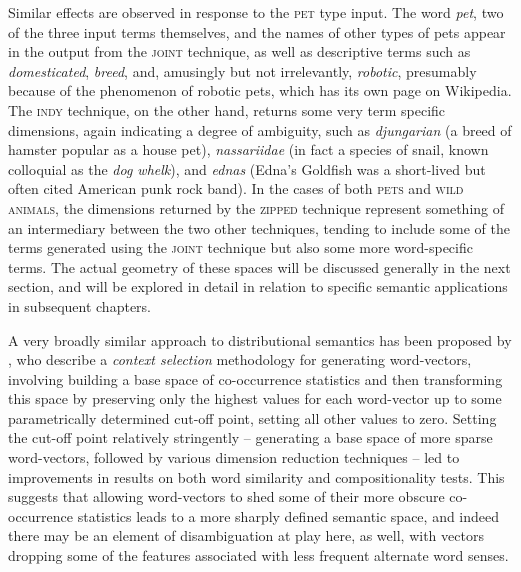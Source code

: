 Similar effects are observed in response to the \textsc{pet} type input.  The word \emph{pet}, two of the three input terms themselves, and the names of other types of pets appear in the output from the \textsc{joint} technique, as well as descriptive terms such as \emph{domesticated}, \emph{breed}, and, amusingly but not irrelevantly, \emph{robotic}, presumably because of the phenomenon of robotic pets, which has its own page on Wikipedia.  The \textsc{indy} technique, on the other hand, returns some very term specific dimensions, again indicating a degree of ambiguity, such as \emph{djungarian} (a breed of hamster popular as a house pet), \emph{nassariidae} (in fact a species of snail, known colloquial as the \emph{dog whelk}), and \emph{ednas} (Edna's Goldfish was a short-lived but often cited American punk rock band).  In the cases of both \textsc{pets} and \textsc{wild animals}, the dimensions returned by the \textsc{zipped} technique represent something of an intermediary between the two other techniques, tending to include some of the terms generated using the \textsc{joint} technique but also some more word-specific terms.  The actual geometry of these spaces will be discussed generally in the next section, and will be explored in detail in relation to specific semantic applications in subsequent chapters.

A very broadly similar approach to distributional semantics has been proposed by \cite{PolajnarEA2014}, who describe a \emph{context selection} methodology for generating word-vectors, involving building a base space of co-occurrence statistics and then transforming this space by preserving only the highest values for each word-vector up to some parametrically determined cut-off point, setting all other values to zero.  Setting the cut-off point relatively stringently -- generating a base space of more sparse word-vectors, followed by various dimension reduction techniques -- led to improvements in results on both word similarity and compositionality tests.  This suggests that allowing word-vectors to shed some of their more obscure co-occurrence statistics leads to a more sharply defined semantic space, and indeed there may be an element of disambiguation at play here, as well, with vectors dropping some of the features associated with less frequent alternate word senses.

